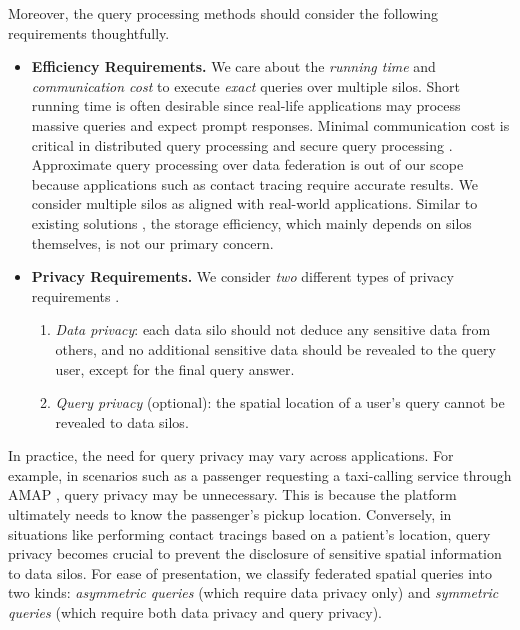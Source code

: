 Moreover, the query processing methods should consider the following requirements thoughtfully.
\begin{itemize}
	\item \textbf{Efficiency Requirements.}
	We care about the \textit{running time} and \textit{communication cost} to execute \textit{exact} queries over multiple silos.
    Short running time is often desirable since real-life applications may process massive queries and expect prompt responses.
	Minimal communication cost is critical in distributed query processing \cite{DBLP:books/sp/OzsuV20} and secure query processing \cite{DBLP:reference/dbsec/2008}.
	Approximate query processing over data federation \cite{DBLP:journals/pvldb/BaterP0WR20,DBLP:conf/sigmod/ChowdhuryW0MJ20,DBLP:conf/dasfaa/ZhangTSZXCZXLZ23} is out of our scope because applications such as contact tracing require accurate results.
	We consider multiple silos as aligned with real-world applications.
	Similar to existing solutions \cite{vldb17smcql, eurosys19conclave}, the storage efficiency, which mainly depends on silos themselves, is not our primary concern.
 
    \item \textbf{Privacy Requirements.}
    We consider \textit{two} different types of privacy requirements \cite{DBLP:reference/dbsec/2008,DBLP:journals/ftsec/EvansKR18}.
    \begin{enumerate}[(1)]
    \item \textit{Data privacy}: each data silo should not deduce any sensitive data from others, and no additional sensitive data should be revealed to the query user, except for the final query answer.
    \item \textit{Query privacy} (optional): the spatial location of a user's query cannot be revealed to data silos.
    \end{enumerate}
\end{itemize}

In practice, the need for query privacy may vary across applications.
For example, in scenarios such as a passenger requesting a taxi-calling service through AMAP \cite{AMAP}, query privacy may be unnecessary. 
This is because the platform ultimately needs to know the passenger's pickup location.
Conversely, in situations like performing contact tracings based on a patient's location, query privacy becomes crucial to prevent the disclosure of sensitive spatial information to data silos. 
For ease of presentation, we classify federated spatial queries into two kinds: 
\textit{asymmetric queries} (which require data privacy only) and \textit{symmetric queries} (which require both data privacy and query privacy).

